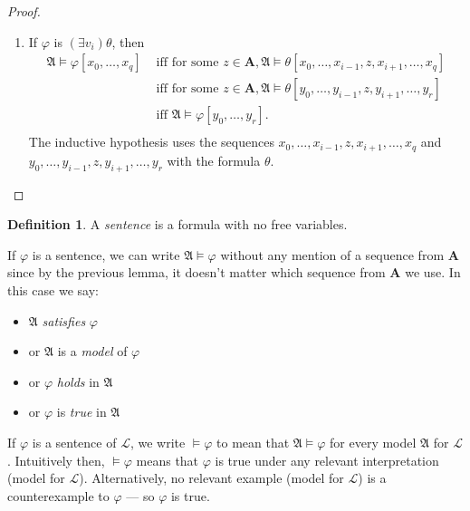 \documentclass[titlepage, oneside]{amsbook}
\theoremstyle{plain}
\theoremstyle{definition}
\newtheorem{definition}{Definition}
\theoremstyle{remark}
\newcommand{\lan}{\ensuremath{\mathcal{L}}}
\newcommand{\ma}{\ensuremath{\mathfrak{A}}}
\newcommand{\ba}{\ensuremath{\mathbf{A}}}
\newcommand{\ynot}[2][0]{\ensuremath{ y_{#1} , \dots , y_{#2}}}
\begin{document}
\begin{proof}
\begin{enumerate}
\item If $\varphi$ is $(\exists v_{i}) \theta$, then
\[ \begin{aligned}\mathfrak{A}  \models \varphi [x_{0} , \dots ,
x_{q}] &\mbox{ iff for some } z \in \mathbf{A}, \mathfrak{A} \models
\theta
[x_{0}, \dots ,x_{i-1}, z, x_{i+1} , \dots , x_{q}] \\
&\mbox{ iff for some } z \in \ba, \ma \models \theta
[\ynot{i-1},z,y_{i+1}, \dots , y_r]\\
&\mbox{ iff } \ma \models \varphi [\ynot{r}]. \\
\end{aligned} \]
The inductive hypothesis uses the sequences $ x_0, \dots ,
x_{i-1}, z, x_{i+1} , \dots , x_{q}$ and $ y_0 , \dots , y_{i-1} , z,
y_{i+1} , \dots , y_r $ with the formula $\theta$.


\end{enumerate}

\end{proof}


\begin{definition}
%
  A \emph{sentence} is a formula with no free
variables.
\end{definition}




If $\varphi$ is a sentence, we can write
$\mathfrak{A} \models \varphi$ 
without any mention of a sequence from $\mathbf{A}$ since by the
previous lemma, it doesn't matter which sequence from $\ba$ we use. In
this case we say: \begin{itemize}
\item $\mathfrak{A}$ \emph{satisfies} $\varphi$
\item or $\mathfrak{A}$ is a \emph{model} of $\varphi$
\item or $\varphi$ \emph{holds} in $\mathfrak{A}$
\item or $\varphi$ is \emph{true} in $\mathfrak{A}$
\end{itemize}

If $\varphi$ is a sentence of $\lan$, we write
$\models \varphi$ to mean that $\ma \models \varphi$ for every model
$\ma$ for $\lan$. Intuitively then, $\models \varphi$ means that
$\varphi$ is true under any relevant interpretation (model for $\lan$).
Alternatively, no relevant example (model for $\lan$) is a
counterexample to $\varphi$ --- so  $\varphi $ is true.
\end{document}
